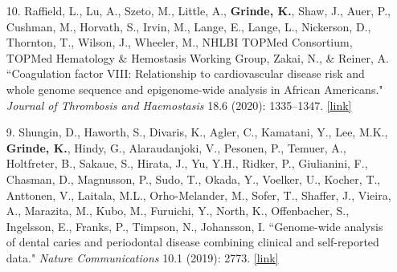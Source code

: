 \documentclass[margin]{res}
\newcommand{\annotateItem}[1]{
	\begin{itemize} \vspace{-0.1cm}
	\item[] 
	\begin{footnotesize}\textcolor{black}{(#1)}\end{footnotesize}
	\end{itemize} \vspace{-0.1cm}
}
\begin{document}
\begin{resume}
\begin{itemize}
\item[10.] Raffield, L., Lu, A., Szeto, M., Little, A., \textbf{Grinde, K.},  Shaw, J., Auer, P., Cushman, M., Horvath, S., Irvin, M., Lange, E., Lange, L., Nickerson, D., Thornton, T., Wilson, J., Wheeler, M., NHLBI TOPMed Consortium, TOPMed Hematology \& Hemostasis Working Group, Zakai, N., \& Reiner, A. ``Coagulation factor VIII: Relationship to cardiovascular disease risk and whole genome sequence and epigenome-wide analysis in African Americans." \textit{Journal of Thrombosis and Haemostasis} 18.6 (2020): 1335--1347.
\href{https://www.sciencedirect.com/science/article/pii/S1538783622014118}{[link]}

\item[9.] Shungin, D., Haworth, S., Divaris, K., Agler, C., Kamatani, Y., Lee, M.K., \textbf{Grinde, K.}, Hindy, G., Alaraudanjoki, V., Pesonen, P., Temuer, A., Holtfreter, B., Sakaue, S., Hirata, J., Yu, Y.H., Ridker, P., Giulianini, F., Chasman, D., Magnusson, P., Sudo, T., Okada, Y., Voelker, U., Kocher, T., Anttonen, V., Laitala, M.L., Orho-Melander, M., Sofer, T., Shaffer, J., Vieira, A., Marazita, M., Kubo, M., Furuichi, Y., North, K., Offenbacher, S., Ingelsson, E., Franks, P., Timpson, N., Johansson, I. ``Genome-wide analysis of dental caries and periodontal disease combining clinical and self-reported data." \textit{Nature Communications} 10.1 (2019): 2773.
\href{https://www.nature.com/articles/s41467-019-10630-1}{[link]}


\end{itemize}
\end{resume}
\end{document}
